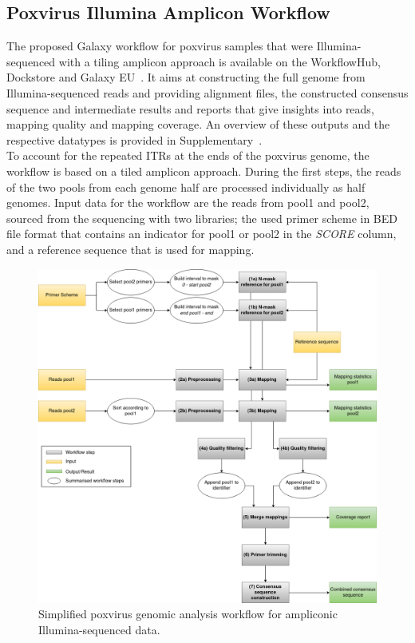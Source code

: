 \subsection{Poxvirus Illumina Amplicon Workflow}\label{sec:pox-wf}
The proposed Galaxy workflow for poxvirus samples that were Illumina-sequenced with a tiling amplicon approach is available on the WorkflowHub, Dockstore and Galaxy EU~. It aims at constructing the full genome from Illumina-sequenced reads and providing alignment files, the constructed consensus sequence and intermediate results and reports that give insights into reads, mapping quality and mapping coverage. An overview of these outputs and the respective datatypes is provided in Supplementary~. \\
To account for the repeated \acp{ITR} at the ends of the poxvirus genome, the workflow is based on a tiled amplicon approach. During the first steps, the reads of the two pools from each genome half are processed individually as half genomes. Input data for the workflow are the reads from pool1 and pool2, sourced from the sequencing with two libraries; the used primer scheme in \ac{BED} file format that contains an indicator for pool1 or pool2 in the \textit{SCORE} column, and a reference sequence that is used for mapping. 

\begin{figure}[ht!]
	\includegraphics[width=1\textwidth]{media/3-pox.png}
	\caption{Simplified poxvirus genomic analysis workflow for ampliconic Illumina-sequenced data.}
	\label{fig:3-pox-wf}
\end{figure}

